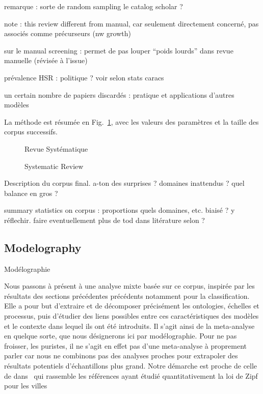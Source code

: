 remarque : sorte de random sampling le catalog scholar ?

note : this review different from manual, car seulement directement concerné, pas associés comme précurseurs (nw growth)

sur le manual screening : permet de pas louper ``poids lourds'' dans revue manuelle (révisée à l'issue)

prévalence HSR : politique ? voir selon stats caracs

un certain nombre de papiers discardés : pratique et applications d'autres modèles

La méthode est résumée en Fig.~\ref{fig:modelography:systematicreview}, avec les valeurs des paramètres et la taille des corpus successifs. 


\begin{figure}
%
\caption{Systematic Review}{Revue Systématique}
\label{fig:modelography:systematicreview}
\end{figure}


Description du corpus final. a-ton des surprises ? domaines inattendus ? quel balance en gros ?

summary statistics on corpus : proportions quels domaines, etc. biaisé ? y réflechir. faire eventuellement plus de tod dans litérature selon ?




\subsection{Modelography}{Modélographie}


Nous passons à présent à une analyse mixte basée sur ce corpus, inspirée par les résultats des sections précédentes précédents notamment pour la classification. Elle a pour but d'extraire et de décomposer précisément les ontologies, échelles et processus, puis d'étudier des liens possibles entre ces caractéristiques des modèles et le contexte dans lequel ils ont été introduits. Il s'agit ainsi de la meta-analyse en quelque sorte, que nous désignerons ici par modélographie. Pour ne pas froisser, les puristes, il ne s'agit en effet pas d'une meta-analyse à proprement parler car nous ne combinons pas des analyses proches pour extrapoler des résultats potentiels d'échantillons plus grand. Notre démarche est proche de celle de  dans~\cite{2016arXiv160606162C} qui rassemble les références ayant étudié quantitativement la loi de Zipf pour les villes


